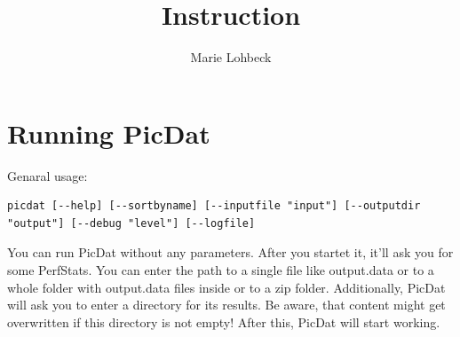 \documentclass[8pt]{extarticle}
\title{Instruction}
\author{Marie Lohbeck}
\begin{document}
\section*{Running PicDat}
Genaral usage: 
\begin{lstlisting}
picdat [--help] [--sortbyname] [--inputfile "input"] [--outputdir "output"] [--debug "level"] [--logfile]
\end{lstlisting}

You can run PicDat without any parameters. After you startet it, it'll ask you for some PerfStats. You can enter the path to a single file like output.data or to a whole folder with output.data files inside or to a zip folder. Additionally, PicDat will ask you to enter a directory for its results. Be aware, that content might get overwritten if this directory is not empty! After this, PicDat will start working. 
\end{document}
